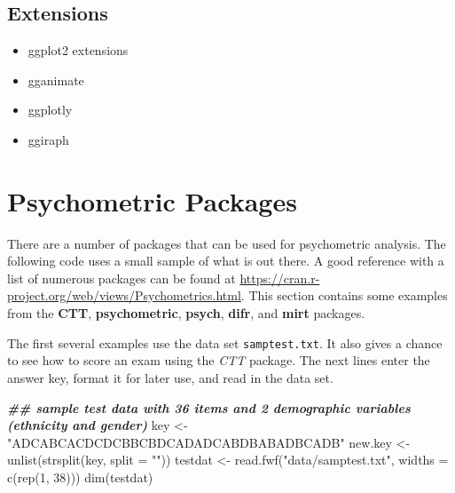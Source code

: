 \documentclass[
]{book}
\newenvironment{Shaded}{\begin{snugshade}}{\end{snugshade}}
\newcommand{\AttributeTok}[1]{\textcolor[rgb]{0.77,0.63,0.00}{#1}}
\newcommand{\DecValTok}[1]{\textcolor[rgb]{0.00,0.00,0.81}{#1}}
\newcommand{\DocumentationTok}[1]{\textcolor[rgb]{0.56,0.35,0.01}{\textbf{\textit{#1}}}}
\newcommand{\FunctionTok}[1]{\textcolor[rgb]{0.00,0.00,0.00}{#1}}
\newcommand{\NormalTok}[1]{#1}
\newcommand{\OtherTok}[1]{\textcolor[rgb]{0.56,0.35,0.01}{#1}}
\newcommand{\StringTok}[1]{\textcolor[rgb]{0.31,0.60,0.02}{#1}}
\providecommand{\tightlist}{%
  \setlength{\itemsep}{0pt}\setlength{\parskip}{0pt}}
\begin{document}
\hypertarget{extensions-1}{%
\section{Extensions}\label{extensions-1}}

\begin{itemize}
\tightlist
\item
  ggplot2 extensions
\item
  gganimate
\item
  ggplotly
\item
  ggiraph
\end{itemize}

\hypertarget{psychometric-packages}{%
\chapter{Psychometric Packages}\label{psychometric-packages}}

There are a number of packages that can be used for psychometric analysis. The following code uses a small sample of what is out there. A good reference with a list of numerous packages can be found at \url{https://cran.r-project.org/web/views/Psychometrics.html}. This section contains some examples from the \textbf{CTT}, \textbf{psychometric}, \textbf{psych}, \textbf{difr}, and \textbf{mirt} packages.

The first several examples use the data set \texttt{samptest.txt}. It also gives a chance to see how to score an exam using the \emph{CTT} package. The next lines enter the answer key, format it for later use, and read in the data set.

\begin{Shaded}
\begin{Highlighting}[]
\DocumentationTok{\#\# sample test data with 36 items and 2 demographic variables (ethnicity and gender)}
\NormalTok{key }\OtherTok{\textless{}{-}} \StringTok{"ADCABCACDCDCBBCBDCADADCABDBABADBCADB"}
\NormalTok{new.key }\OtherTok{\textless{}{-}} \FunctionTok{unlist}\NormalTok{(}\FunctionTok{strsplit}\NormalTok{(key, }\AttributeTok{split =} \StringTok{""}\NormalTok{))}
\NormalTok{testdat }\OtherTok{\textless{}{-}} \FunctionTok{read.fwf}\NormalTok{(}\StringTok{"data/samptest.txt"}\NormalTok{, }\AttributeTok{widths =} \FunctionTok{c}\NormalTok{(}\FunctionTok{rep}\NormalTok{(}\DecValTok{1}\NormalTok{, }\DecValTok{38}\NormalTok{)))}
\FunctionTok{dim}\NormalTok{(testdat)}
\end{Highlighting}
\end{Shaded}
\end{document}
